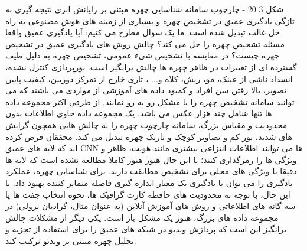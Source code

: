 شکل ‏3 20 - چارچوب سامانه شناسایی چهره مبتنی بر رایانش ابری
	نتیجه گیری
به تازگی یادگیری عمیق در تشخیص چهره و بسیاری از زمینه های هوش مصنوعی به راه حل غالب تبدیل شده است. ما یک سوال مطرح می کنیم: آیا یادگیری عمیق واقعا مسئله تشخیص چهره را حل می کند؟ چالش روش های یادگیری عمیق در تشخیص چهره چیست؟ 
در مقایسه با تشخیص شیء عمومی، تشخیص چهره به دلیل طیف گسترده ای از تغییرات در ظاهر چهره ها چالش برانگیز است. نورپردازی کنترل نشده، انسداد ناشی از عینک، مو، ریش، کلاه و... ، تاری خارج از تمرکز دوربین، کیفیت پایین تصویر، بالا رفتن سن افراد و کمبود داده های آموزشی از مواردی می باشند که می توانند سامانه تشخیص چهره را با مشکل رو به رو نمایند.
از طرفی اکثر مجموعه داده ها تنها شامل چند هزار عکس می باشد. یک مجموعه داده حاوی اطلاعات بدون محدودیت و مقیاس بزرگ، سامانه چارچوب چهره را به چالش هایی همچون گرایش های شدید، نور کم و تصاویر کوچک و تاریک چهره تبدیل می کند. محققان فرض کرده اند که لایه های عمیق CNN ها می توانند اطلاعات انتزاعی بیشتری مانند هویت، ظاهر و ویژگی ها را رمزگذاری کنند؛ با این حال هنوز هنوز کاملا مطالعه نشده است که لایه ها دقیقا با ویژگی های محلی برای تشخیص مطابقت دارند.
برای شناسایی چهره، عملکرد یادگیری را می توان با یادگیری یک معیار اندازه گیری فاصله متمایز کننده بهبود داد. با این حال، با توجه به محدودیت های حافظه کارت گرافیک ها، نحوه انتخاب جفت ها یا سه گانه های اطلاعاتی و روش های آموزش آنلاین (به عنوان مثال، گرادیان نزولی) در مجموعه داده های بزرگ، هنوز یک مشکل باز است. یکی دیگر از مشکلات چالش برانگیز این است که پردازش ویدیو در شبکه های عمیق را برای استفاده از تجزیه و تحلیل چهره مبتنی بر ویدئو ترکیب کند.  



